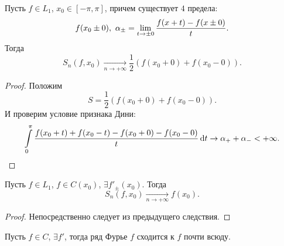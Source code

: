 \begin{corollary}
    Пусть $f \in L_1$, $x_0 \in [-\pi, \pi]$, причем существует $4$ предела:
    \[
        f(x_0 \pm 0),~ \alpha_\pm = \lim_{t \to \pm 0}{\frac{f(x + t) - f(x \pm 0)}{t}}
    .\]
    Тогда
    \[
        S_n(f, x_0) \xrightarrow[n \to +\infty]{} \frac{1}{2}(f(x_0 + 0) + f(x_0 - 0))
    .\]
\end{corollary}
\begin{proof}
    Положим
    \[
        S = \frac{1}{2}(f(x_0 + 0) + f(x_0 - 0))
    .\]
    И проверим условие признака Дини:
    \[
        \int\limits_0^\pi{\frac{f(x_0 + t) + f(x_0 - t) - f(x_0 + 0) - f(x_0 - 0)}{t} \,\mathrm{d}t}
        \to \alpha_+ + \alpha_- < +\infty
    .\]
\end{proof}

\begin{corollary}
    Пусть $f \in L_1$, $f \in C(x_0)$, $\exists f'_\pm(x_0)$. Тогда
    \[
        S_n(f, x_0) \xrightarrow[n \to +\infty]{} f(x_0)
    .\]
\end{corollary}
\begin{proof}
    Непосредственно следует из предыдущего следствия.
\end{proof}

\begin{corollary}
    Пусть $f \in C$, $\exists f'$, тогда ряд Фурье $f$ сходится к $f$ почти всюду.
\end{corollary}

